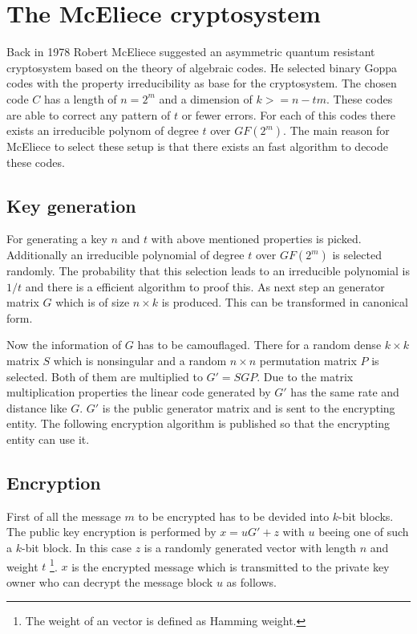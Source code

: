\section{The McEliece cryptosystem}
\label{mceliece}
Back in 1978 Robert McEliece suggested an asymmetric quantum resistant cryptosystem based on the theory of algebraic codes. He selected binary Goppa codes with the property irreducibility as base for the cryptosystem\cite{mceliece1978public}. The chosen code $C$ has a length of $n = 2^m$ and a dimension of $k >= n - tm$. These codes are able to correct any pattern of $t$ or fewer errors. 
For each of this codes there exists an irreducible polynom of degree $t$ over $GF(2^m)$. 
The main reason for McEliece to select these setup is that there exists an fast algorithm to decode these codes\cite{mceliece2002theory}.

\subsection*{Key generation}
For generating a key $n$ and $t$ with above mentioned properties is picked. Additionally an irreducible polynomial of degree $t$ over $GF(2^m)$  is selected randomly. The probability that this selection leads to an irreducible polynomial is $1/t$ and there is a efficient algorithm to proof this\cite{berlekamp1968algebraic}.
As next step an generator matrix $G$ which is of size $n \times k$ is produced. This can be transformed in canonical form. 

Now the information of $G$ has to be camouflaged. There for a random dense $k \times k$ matrix $S$ which is nonsingular and a random $n \times n$ permutation matrix $P$ is selected. Both of them are multiplied to $G' = SGP$. Due to the matrix multiplication properties the linear code generated by $G'$ has the same rate and distance like $G$. $G'$ is the public generator matrix and is sent to the encrypting entity. 
\newline
\newline
The following encryption algorithm is published so that the encrypting entity can use it. 

\subsection*{Encryption}
First of all the message $m$ to be encrypted has to be devided into $k$-bit blocks. The public key encryption is performed by $x = uG' + z$ with $u$ beeing one of such a $k$-bit block. In this case $z$ is a randomly generated vector with length $n$ and weight $t$ \footnote{The weight of an vector is defined as Hamming weight.}.
\newline
\newline
$x$ is the encrypted message which is transmitted to the private key owner who can decrypt the message block $u$ as follows. 

